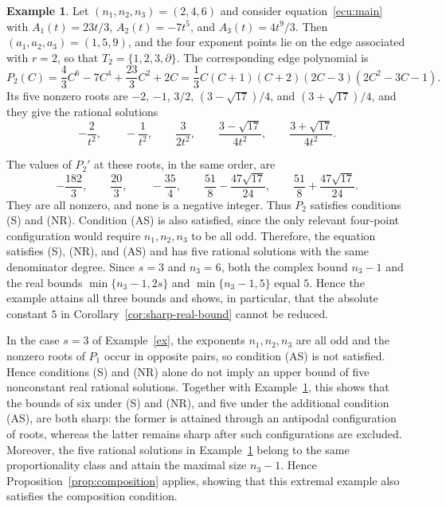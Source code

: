 \documentclass[12pt,a4paper]{amsart}
\numberwithin{theorem}{section}
\theoremstyle{definition}
\newtheorem{example}[theorem]{Example}
\begin{document}
	\begin{example}\label{ex:sharp-real}
		Let $(n_1,n_2,n_3)=(2,4,6)$ and consider equation~\eqref{ecu:main} with $A_1(t)=23t/3$, $A_2(t)=-7t^5$, and $A_3(t)=4t^9/3$. Then $(a_1,a_2,a_3)=(1,5,9)$, and the four exponent points lie on the edge associated with $r=2$, so that $T_2=\{1,2,3,\partial\}$. The corresponding edge polynomial is
		\[
		P_2(C)=\frac{4}{3}C^6-7C^4+\frac{23}{3}C^2+2C=\frac{1}{3}C(C+1)(C+2)(2C-3)(2C^2-3C-1).
		\]
		Its five nonzero roots are $-2$, $-1$, $3/2$, $(3-\sqrt{17})/4$, and $(3+\sqrt{17})/4$, and they give the rational solutions
		\[
		-\frac{2}{t^2},\qquad -\frac{1}{t^2},\qquad \frac{3}{2t^2},\qquad \frac{3-\sqrt{17}}{4t^2},\qquad \frac{3+\sqrt{17}}{4t^2}.
		\]
		
		The values of $P_2'$ at these roots, in the same order, are
		\[
		-\frac{182}{3},\qquad \frac{20}{3},\qquad -\frac{35}{4},\qquad \frac{51}{8}-\frac{47\sqrt{17}}{24},\qquad \frac{51}{8}+\frac{47\sqrt{17}}{24}.
		\]
		They are all nonzero, and none is a negative integer. Thus $P_2$ satisfies conditions {\rm (S)} and {\rm (NR)}. Condition {\rm (AS)} is also satisfied, since the only relevant four-point configuration would require $n_1,n_2,n_3$ to be all odd. Therefore, the equation satisfies {\rm (S)}, {\rm (NR)}, and {\rm (AS)} and has five rational solutions with the same denominator degree. Since $s=3$ and $n_3=6$, both the complex bound $n_3-1$ and the real bounds $\min\{n_3-1,2s\}$ and $\min\{n_3-1,5\}$ equal $5$. Hence the example attains all three bounds and shows, in particular, that the absolute constant $5$ in Corollary~\ref{cor:sharp-real-bound} cannot be reduced.
	\end{example}
	
	In the case $s=3$ of Example~\ref{ex}, the exponents $n_1,n_2,n_3$ are all odd and the nonzero roots of $P_1$ occur in opposite pairs, so condition {\rm (AS)} is not satisfied. Hence conditions {\rm (S)} and {\rm (NR)} alone do not imply an upper bound of five nonconstant real rational solutions. Together with Example~\ref{ex:sharp-real}, this shows that the bounds of six under {\rm (S)} and {\rm (NR)}, and five under the additional condition {\rm (AS)}, are both sharp: the former is attained through an antipodal configuration of roots, whereas the latter remains sharp after such configurations are excluded. Moreover, the five rational solutions in Example~\ref{ex:sharp-real} belong to the same proportionality class and attain the maximal size $n_3-1$. Hence Proposition~\ref{prop:composition} applies, showing that this extremal example also satisfies the composition condition.
	
\end{document}
